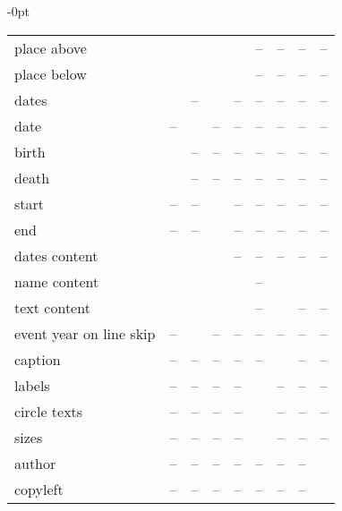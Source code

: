 \documentclass[10pt,british,a4paper]{ltxdoc}
\newcommand*{\fycheck}{\checkmark}
\newcommand*{\fycross}{--}
\newlength\tewadjust
\begin{document}
\begin{table}
\begin{adjustwidth}{-\tewadjust}{0pt}
\begin{tabular}{>{\ttfamily}lcccccccc}
      place above    & \fycheck  & \fycheck & \fycheck & \fycheck  &  \fycross &\fycross  & \fycross & \fycross \\
      place below    & \fycheck  & \fycheck & \fycheck & \fycheck  &  \fycross &\fycross  & \fycross & \fycross \\
      dates    & \fycheck   & \fycross & \fycheck & \fycross &  \fycross &\fycross  & \fycross & \fycross \\
      date    & \fycross   & \fycheck & \fycross & \fycross &  \fycross &\fycross  & \fycross & \fycross \\
      birth    & \fycheck  & \fycross & \fycross & \fycross  &  \fycross &\fycross  & \fycross & \fycross \\
      death    & \fycheck  & \fycross & \fycross & \fycross  &  \fycross &\fycross  & \fycross & \fycross \\
      start     & \fycross   & \fycross & \fycheck & \fycross &  \fycross &\fycross  & \fycross & \fycross  \\
      end     & \fycross   & \fycross & \fycheck & \fycross &  \fycross &\fycross   & \fycross & \fycross \\
      dates content    & \fycheck   & \fycheck & \fycheck & \fycross &  \fycross &\fycross  & \fycross & \fycross \\
      name content    & \fycheck  & \fycheck & \fycheck & \fycheck &  \fycross &\fycheck  & \fycheck  & \fycheck  \\
      text content    & \fycheck  & \fycheck & \fycheck & \fycheck &  \fycross &\fycheck  & \fycross & \fycross \\
      event year on line skip & \fycross & \fycheck & \fycross & \fycross & \fycross & \fycross & \fycross & \fycross \\
      caption & \fycross   & \fycross & \fycross & \fycross &  \fycross &\fycheck   & \fycross & \fycross \\
      labels & \fycross   & \fycross & \fycross & \fycross &  \fycheck &\fycross   &  \fycross & \fycross \\
      circle texts & \fycross   & \fycross & \fycross & \fycross &  \fycheck &\fycross   &  \fycross & \fycross \\
      sizes & \fycross   & \fycross & \fycross & \fycross &  \fycheck &\fycross   &  \fycross & \fycross \\
      author& \fycross   & \fycross & \fycross & \fycross &  \fycross &\fycross   &  \fycross & \fycheck  \\
      copyleft &  \fycross   & \fycross & \fycross & \fycross &  \fycross &\fycross   &  \fycross & \fycheck  \\

\end{tabular}
\end{adjustwidth}
\end{table}
\end{document}
